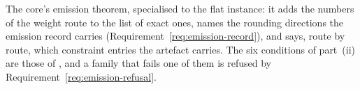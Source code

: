 
The core's emission theorem, specialised to the flat instance: it adds the
numbers of the weight route to the list of exact ones, names the rounding
directions the emission record carries (Requirement~\ref{req:emission-record}),
and says, route by route, which constraint entries the artefact carries.
The six conditions of part~(ii) are those of
, and a family that fails one of them is
refused by Requirement~\ref{req:emission-refusal}.

